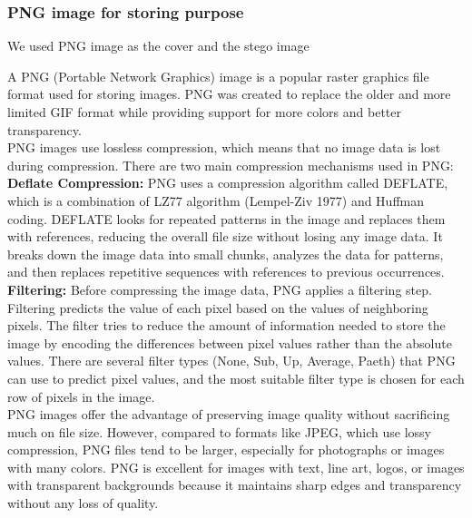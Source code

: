 \documentclass{report}
\begin{document}
\subsubsection{PNG image for storing purpose}
We used PNG image as the cover and the stego image

A PNG (Portable Network Graphics) image is a popular raster graphics file format used for storing images. PNG was created to replace the older and more limited GIF format while providing support for more colors and better transparency.\\
PNG images use lossless compression, which means that no image data is lost during compression. There are two main compression mechanisms used in PNG:
\\
\textbf{Deflate Compression:} PNG uses a compression algorithm called DEFLATE, which is a combination of LZ77 algorithm (Lempel-Ziv 1977) and Huffman coding. DEFLATE looks for repeated patterns in the image and replaces them with references, reducing the overall file size without losing any image data. It breaks down the image data into small chunks, analyzes the data for patterns, and then replaces repetitive sequences with references to previous occurrences.\\
\textbf{Filtering:} Before compressing the image data, PNG applies a filtering step. Filtering predicts the value of each pixel based on the values of neighboring pixels. The filter tries to reduce the amount of information needed to store the image by encoding the differences between pixel values rather than the absolute values. There are several filter types (None, Sub, Up, Average, Paeth) that PNG can use to predict pixel values, and the most suitable filter type is chosen for each row of pixels in the image.\\
PNG images offer the advantage of preserving image quality without sacrificing much on file size. However, compared to formats like JPEG, which use lossy compression, PNG files tend to be larger, especially for photographs or images with many colors. PNG is excellent for images with text, line art, logos, or images with transparent backgrounds because it maintains sharp edges and transparency without any loss of quality.
\end{document}

